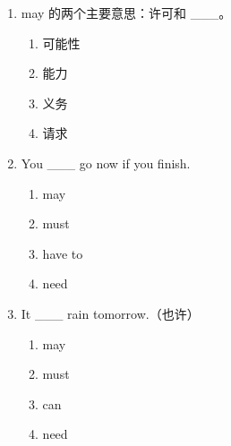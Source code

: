 \documentclass[11pt,a4paper]{ctexart}
\begin{document}
\begin{enumerate}[leftmargin=*,itemsep=4pt]
\begin{enumerate}[label=\Alph*.,leftmargin=2em,itemsep=1pt,topsep=2pt]
\end{enumerate}
\item may 的两个主要意思：许可和 \_\_\_。
\begin{enumerate}[label=\Alph*.,leftmargin=2em,itemsep=1pt,topsep=2pt]
\item 可能性
\item 能力
\item 义务
\item 请求
\end{enumerate}
\item You \_\_\_ go now if you finish.
\begin{enumerate}[label=\Alph*.,leftmargin=2em,itemsep=1pt,topsep=2pt]
\item may
\item must
\item have to
\item need
\end{enumerate}
\item It \_\_\_ rain tomorrow.（也许）
\begin{enumerate}[label=\Alph*.,leftmargin=2em,itemsep=1pt,topsep=2pt]
\item may
\item must
\item can
\item need
\end{enumerate}
\end{enumerate}
\end{document}
